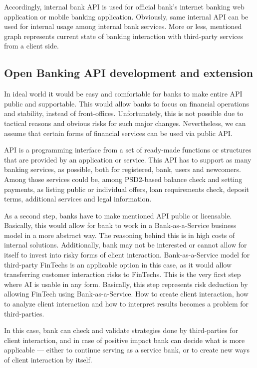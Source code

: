 Accordingly, internal bank API is used for official bank's internet banking web application or mobile banking application. 
Obviously, same internal API can be used for internal usage among internal bank services.
More or less, mentioned graph represents current state of banking interaction with third-party services from a client side.


\subsection{Open Banking API development and extension}

In ideal world it would be easy and comfortable for banks to make entire API public and supportable.
This would allow banks to focus on financial operations and stability, instead of front-offices.
Unfortunately, this is not possible due to tactical reasons and obvious risks for such major changes.
Nevertheless, we can assume that certain forms of financial services can be used via public API.

API is a programming interface from a set of ready-made functions or structures that are provided by an application or service.
This API has to support as many banking services, as possible, both for registered, bank, users and newcomers. 
Among those services could be, among PSD2-based balance check and setting payments, as listing public or individual offers, loan requirements check, deposit terms, additional services and legal information.

As a second step, banks have to make mentioned API public or licensable.
Basically, this would allow for bank to work in a Bank-as-a-Service business model in a more abstract way.
The reasoning behind this is in high costs of internal solutions. 
Additionally, bank may not be interested or cannot allow for itself to invest into risky forms of client interaction.
Bank-as-a-Service model for third-party FinTechs is an applicable option in this case, as it would allow transferring customer interaction risks to FinTechs.
This is the very first step where AI is usable in any form.
Basically, this step represents risk deduction by allowing FinTech using Bank-as-a-Service.
How to create client interaction, how to analyze client interaction and how to interpret results becomes a problem for third-parties.

In this case, bank can check and validate strategies done by third-parties for client interaction, and in case of positive impact bank can decide what is more applicable — either to continue serving as a service bank, or to create new ways of client interaction by itself.

